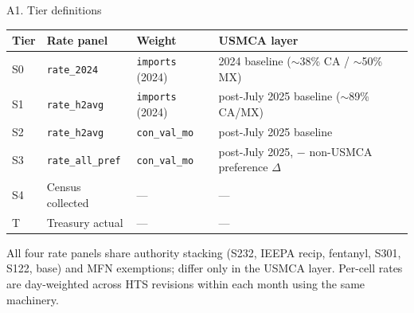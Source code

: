 \documentclass[aspectratio=169,10pt]{beamer}
\begin{document}

\begin{frame}{A1. Tier definitions}

\small

\begin{tabular}{l l l l}
\toprule
Tier & Rate panel & Weight & USMCA layer \\
\midrule
S0 & \texttt{rate\_2024}      & \texttt{imports} (2024)    & 2024 baseline ($\sim$38\% CA / $\sim$50\% MX) \\
S1 & \texttt{rate\_h2avg}     & \texttt{imports} (2024)    & post-July 2025 baseline ($\sim$89\% CA/MX) \\
S2 & \texttt{rate\_h2avg}     & \texttt{con\_val\_mo}      & post-July 2025 baseline \\
S3 & \texttt{rate\_all\_pref} & \texttt{con\_val\_mo}      & post-July 2025, $-$ non-USMCA preference $\Delta$ \\
S4 & Census collected         & ---                        & --- \\
T  & Treasury actual          & ---                        & --- \\
\bottomrule
\end{tabular}

\vspace{0.6em}

All four rate panels share authority stacking (S232, IEEPA recip, fentanyl, S301, S122, base) and MFN exemptions; differ only in the USMCA layer. Per-cell rates are day-weighted across HTS revisions within each month using the same machinery.

\end{frame}
\end{document}
